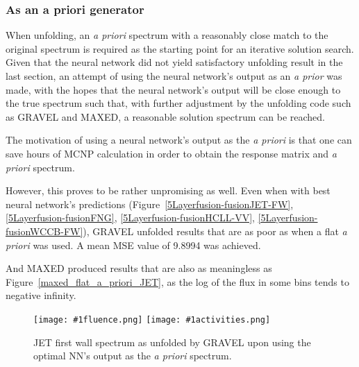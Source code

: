 \documentclass[a4paper, 12pt]{article}
\newcommand{\fluenceandactivities}[1]{
\texttt{[image: \#1fluence.png]}
\texttt{[image: \#1activities.png]}
}
\begin{document}
\subsubsection{As an a priori generator}
    When unfolding, an \emph{a priori} spectrum with a reasonably close match to the original spectrum is required as the starting point for an iterative solution search. Given that the neural network did not yield satisfactory unfolding result in the last section, an attempt of using the neural network's output as an \emph{a prior} was made, with the hopes that the neural network's output will be close enough to the true spectrum such that, with further adjustment by the unfolding code such as GRAVEL and MAXED, a reasonable solution spectrum can be reached.

    The motivation of using a neural network's output as the \emph{a priori} is that one can save hours of MCNP calculation in order to obtain the response matrix and \emph{a priori} spectrum.

    However, this proves to be rather unpromising as well. Even when with best neural network's predictions (Figure~\ref{5Layerfusion-fusionJET-FW}, \ref{5Layerfusion-fusionFNG}, \ref{5Layerfusion-fusionHCLL-VV}, \ref{5Layerfusion-fusionWCCB-FW}), GRAVEL unfolded results that are as poor as when a flat \emph{a priori} was used. A mean MSE value of 9.8994 was achieved.

    And MAXED produced results that are also as meaningless as Figure~\ref{maxed_flat_a_priori_JET}, as the log of the flux in some bins tends to negative infinity.

\begin{figure}
    \centering
    \fluenceandactivities{/home/ocean/Documents/GitHubDir/unfolding/unfolding/unfoldingsuite/neuralnetwork/realinputEarlyStopping/comparison/real_fusion_test_gravel_nn_a_priori_test_001_}
    \caption{JET first wall spectrum as unfolded by GRAVEL upon using the optimal NN's output as the \emph{a priori} spectrum.}\label{gravel_nn_a_priori_JET}
\end{figure}

\end{document}
